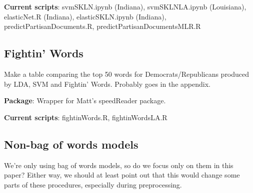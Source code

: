 \documentclass[11pt]{article}
\begin{document}
\textbf{Current scripts}: svmSKLN.ipynb (Indiana), svmSKLNLA.ipynb (Louisiana), elasticNet.R (Indiana), elasticSKLN.ipynb (Indiana), predictPartisanDocuments.R, predictPartisanDocumentsMLR.R

\subsection{Fightin' Words}
Make a table comparing the top 50 words for Democrats/Republicans produced by LDA, SVM and Fightin' Words. Probably goes in the appendix.

\textbf{Package}: Wrapper for Matt's speedReader package.

\textbf{Current scripts}: fightinWords.R, fightinWordsLA.R

\subsection{Non-bag of words models}
We're only using bag of words models, so do we focus only on them in this paper? Either way, we should at least point out that this would change some parts of these procedures, especially during preprocessing.

\newpage

%
%
\end{document}
